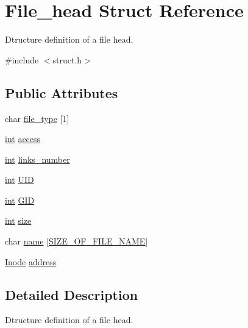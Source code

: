 \hypertarget{struct_file__head}{}\section{File\+\_\+head Struct Reference}
\label{struct_file__head}


Dtructure definition of a file head.  




{\ttfamily \#include $<$struct.\+h$>$}

\subsection*{Public Attributes}
\begin{DoxyCompactItemize}
\item 
char \mbox{\hyperlink{struct_file__head_a3b65def3aec926c458ff68cd303ccfbd}{file\+\_\+type}} \mbox{[}1\mbox{]}
\item 
\mbox{\hyperlink{structint}{int}} \mbox{\hyperlink{struct_file__head_a491a25e734ec5e70c9def393423ea5e5}{access}}
\item 
\mbox{\hyperlink{structint}{int}} \mbox{\hyperlink{struct_file__head_afa5f57f4faebc0075ea25eb4fb80011a}{links\+\_\+number}}
\item 
\mbox{\hyperlink{structint}{int}} \mbox{\hyperlink{struct_file__head_a4a547fa014a07489ddd5b22cff5e48ab}{U\+ID}}
\item 
\mbox{\hyperlink{structint}{int}} \mbox{\hyperlink{struct_file__head_a3233de28137b60a779b223aba1a032c5}{G\+ID}}
\item 
\mbox{\hyperlink{structint}{int}} \mbox{\hyperlink{struct_file__head_a53e6325bcfd6a435902e0a4b09e2459f}{size}}
\item 
char \mbox{\hyperlink{struct_file__head_aa682255565f19d65b22b3c1ba32aafd8}{name}} \mbox{[}\mbox{\hyperlink{constants_8h_a9a18fea8baac399d2416cde730c33888}{S\+I\+Z\+E\+\_\+\+O\+F\+\_\+\+F\+I\+L\+E\+\_\+\+N\+A\+ME}}\mbox{]}
\item 
\mbox{\hyperlink{struct_8h_a98d620fb2fb559434fab4f1283139169}{Inode}} \mbox{\hyperlink{struct_file__head_afce2c61abeaf2de742038edb5d037a83}{address}}
\end{DoxyCompactItemize}


\subsection{Detailed Description}
Dtructure definition of a file head. 

